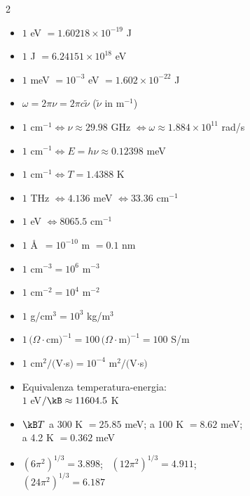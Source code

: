 \vspace{0.3cm}
\begin{multicols}{2}
{\small
\begin{itemize}
    \setlength{\itemsep}{1pt}
    \item $1$ eV $= 1.60218\times10^{-19}$ J
    \item $1$ J $= 6.24151\times10^{18}$ eV
    \item $1$ meV $= 10^{-3}$ eV $= 1.602\times10^{-22}$ J
    \item $\omega = 2\pi\nu = 2\pi c\tilde\nu$ \quad ($\tilde\nu$ in m$^{-1}$)
    \item $1$ cm$^{-1} \iff \nu\approx29.98$ GHz $\iff \omega\approx1.884\times10^{11}$ rad/s
    \item $1$ cm$^{-1} \iff E = h\nu \approx 0.12398$ meV
    \item $1$ cm$^{-1} \iff T = 1.4388$ K
    \item $1$ THz $\iff 4.136$ meV $\iff 33.36$ cm$^{-1}$
    \item $1$ eV $\iff 8065.5$ cm$^{-1}$
    \item $1$ \AA\ $= 10^{-10}$ m $= 0.1$ nm
    \item $1$ cm$^{-3} = 10^{6}$ m$^{-3}$
    \item $1$ cm$^{-2} = 10^{4}$ m$^{-2}$
    \item $1$ g/cm$^3 = 10^{3}$ kg/m$^3$
    \item $1\,(\Omega\cdot$cm$)^{-1} = 100\,(\Omega\cdot$m$)^{-1} = 100$ S/m
    \item $1$ cm$^2/($V$\cdot$s$) = 10^{-4}$ m$^2/($V$\cdot$s$)$
    \item Equivalenza temperatura-energia: \\ $1$ eV$/\kB \approx 11604.5$ K
    \item $\kB T$ a 300 K $= 25.85$ meV; a 100 K $= 8.62$ meV; \\ a 4.2 K $= 0.362$ meV
    \item $(6\pi^2)^{1/3}=3.898$; \ $(12\pi^2)^{1/3}=4.911$; \\ $(24\pi^2)^{1/3}=6.187$
\end{itemize}}
\end{multicols}

\newpage
